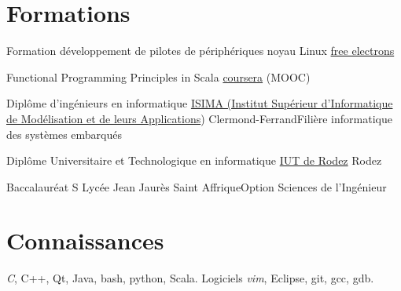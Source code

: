 \documentclass[10pt,a4paper,sans]{moderncv}
\begin{document}



\section{Formations}
	{Formation développement de pilotes de périphériques noyau Linux}
	{\href{http://free-electrons.com/}{free electrons}}
	{}{}{}
	
	{Functional Programming Principles in Scala}
	{\href{https://fr.coursera.org/course/progfun}{coursera}}
	{(MOOC)}{}{}

	{Diplôme d’ingénieurs en informatique}
	{\href{http://www.isima.fr/}{ISIMA (Institut Supérieur d’Informatique de Modélisation et de leurs Applications})}
	{Clermond-Ferrand}{Filière informatique des systèmes embarqués}{}

	{Diplôme Universitaire et Technologique en informatique}
	{\href{http://www.iut-rodez.fr/}{IUT de Rodez}}
	{Rodez}{}{}

	{Baccalauréat S}
	{Lycée Jean Jaurès}
	{Saint Affrique}{Option Sciences de l'Ingénieur}{}


\section{Connaissances}
								{\emph{C}, C++, Qt, Java, bash, python, Scala.}
						 {Logiciels}
								{\emph{vim}, Eclipse, git, gcc, gdb.}
\end{document}
